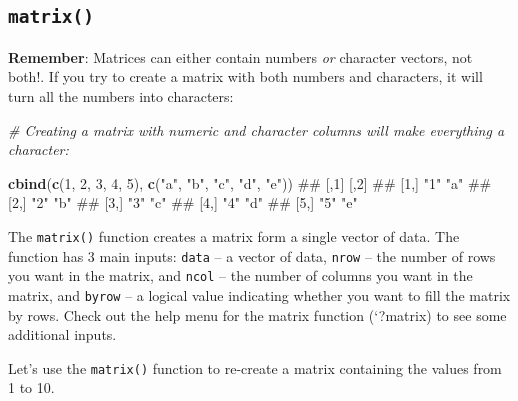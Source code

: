 \documentclass[]{book}
\newenvironment{Shaded}{\begin{snugshade}}{\end{snugshade}}
\newcommand{\KeywordTok}[1]{\textcolor[rgb]{0.13,0.29,0.53}{\textbf{{#1}}}}
\newcommand{\DecValTok}[1]{\textcolor[rgb]{0.00,0.00,0.81}{{#1}}}
\newcommand{\StringTok}[1]{\textcolor[rgb]{0.31,0.60,0.02}{{#1}}}
\newcommand{\CommentTok}[1]{\textcolor[rgb]{0.56,0.35,0.01}{\textit{{#1}}}}
\newcommand{\NormalTok}[1]{{#1}}
\theoremstyle{definition}
\theoremstyle{definition}
\theoremstyle{remark}
\begin{document}
\subsection{\texorpdfstring{\texttt{matrix()}}{matrix()}}\label{matrix}

\textbf{Remember}: Matrices can either contain numbers \emph{or}
character vectors, not both!. If you try to create a matrix with both
numbers and characters, it will turn all the numbers into characters:

\begin{Shaded}
\begin{Highlighting}[]
\CommentTok{# Creating a matrix with numeric and character columns will make everything a character:}

\KeywordTok{cbind}\NormalTok{(}\KeywordTok{c}\NormalTok{(}\DecValTok{1}\NormalTok{, }\DecValTok{2}\NormalTok{, }\DecValTok{3}\NormalTok{, }\DecValTok{4}\NormalTok{, }\DecValTok{5}\NormalTok{),}
      \KeywordTok{c}\NormalTok{(}\StringTok{"a"}\NormalTok{, }\StringTok{"b"}\NormalTok{, }\StringTok{"c"}\NormalTok{, }\StringTok{"d"}\NormalTok{, }\StringTok{"e"}\NormalTok{))}
\NormalTok{##      [,1] [,2]}
\NormalTok{## [1,] "1"  "a" }
\NormalTok{## [2,] "2"  "b" }
\NormalTok{## [3,] "3"  "c" }
\NormalTok{## [4,] "4"  "d" }
\NormalTok{## [5,] "5"  "e"}
\end{Highlighting}
\end{Shaded}

The \texttt{matrix()} function creates a matrix form a single vector of
data. The function has 3 main inputs: \texttt{data} -- a vector of data,
\texttt{nrow} -- the number of rows you want in the matrix, and
\texttt{ncol} -- the number of columns you want in the matrix, and
\texttt{byrow} -- a logical value indicating whether you want to fill
the matrix by rows. Check out the help menu for the matrix function
(`?matrix) to see some additional inputs.

Let's use the \texttt{matrix()} function to re-create a matrix
containing the values from 1 to 10.
\end{document}
